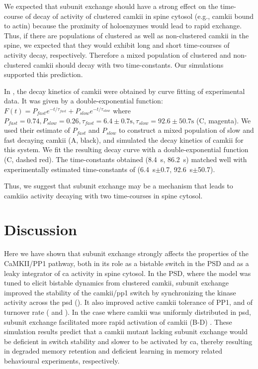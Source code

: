 \documentclass[9pt,lineno,doublespacing]{elife}
\begin{document}
We expected that subunit exchange should have a strong effect on the 
time-course of decay of activity of
clustered \gls{camkii} in spine cytosol (e.g., \gls{camkii} bound to actin)
because the proximity of holoenzymes would lead to rapid exchange. Thus, if
there are populations of clustered as well as non-clustered \gls{camkii} in the
spine, we expected that they would exhibit long and short time-courses of
activity decay, respectively. Therefore a mixed population of clustered and
non-clustered \gls{camkii} should decay with two time-constants. Our
simulations supported this prediction. 

In \cite{chang_camkii_2017}, the decay kinetics of \gls{camkii} were obtained by
curve fitting of experimental data. It was given by a double-exponential
function: $F(t)=P_{fast}e^{-t/\tau_{fast}}+P_{slow}e^{-t/\tau_{slow}}$ where
$P_{fast}=0.74, P_{slow}=0.26, \tau_{fast}= 6.4\pm0.7 \si{\second},
\tau_{slow}=92.6 \pm 50.7\si{\second}$ (C, magenta). We
used their estimate of $P_{fast}$ and $P_{slow}$ to construct a mixed population
of slow and fast decaying \gls{camkii} (A, black),
and simulated the decay kinetics of \gls{camkii} for this system. We fit the
resulting decay curve with a double-exponential function
(C, dashed red). The time-constants obtained
(\SI{8.4}{\second}, \SI{86.2}{\second}) matched well with experimentally
estimated time-constants of (\SI{6.4}{\second}$\pm$0.7,
\SI{92.6}{\second}$\pm$50.7). 

Thus, we suggest that subunit exchange may be a mechanism that leads to
\gls{camkii}$\alpha$ activity decaying with two time-courses in spine 
cytosol.

\section{Discussion}\label{discussion}

Here we have shown that subunit exchange strongly affects the properties of the
CaMKII/PP1 pathway, both in its role as a bistable switch in the PSD and as a
leaky integrator of \gls{ca} activity in spine cytosol. In the PSD, where the
model was tuned to elicit bistable dynamics from clustered \gls{camkii}, subunit
exchange improved the stability of the \gls{camkii}/\gls{pp1} switch by
synchronizing the kinase activity across the \gls{psd}
(). It also improved active \gls{camkii} tolerance of
PP1, and of turnover rate ( and ). In the case
where \gls{camkii} was uniformly distributed in \gls{psd}, subunit exchange
facilitated more rapid activation of \gls{camkii}
(B-D)
\citep{stratton_activation-triggered_2014}. These simulation results predict
that a \gls{camkii} mutant lacking subunit exchange would be deficient in switch
stability and slower to be activated by \gls{ca}, thereby resulting in degraded
memory retention and deficient learning in memory related behavioural
experiments, respectively.
\end{document}
